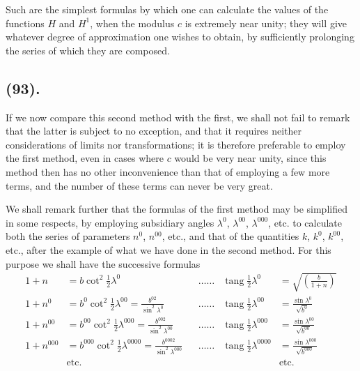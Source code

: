 \documentclass{article}
\begin{document}
Such are the simplest formulas by which one can calculate the values of the functions $H$ and $H^{1}$, when the modulus $c$ is extremely near unity; they will give whatever degree of approximation one wishes to obtain, by sufficiently prolonging the series of which they are composed.

\subsection*{(93).}

If we now compare this second method with the first, we shall not fail to remark that the latter is subject to no exception, and that it requires neither considerations of limits nor transformations; it is therefore preferable to employ the first method, even in cases where $c$ would be very near unity, since this method then has no other inconvenience than that of employing a few more terms, and the number of these terms can never be very great.

We shall remark further that the formulas of the first method may be simplified in some respects, by employing subsidiary angles $\lambda^{0}$, $\lambda^{00}$, $\lambda^{000}$, etc. to calculate both the series of parameters $n^{0}$, $n^{00}$, etc., and that of the quantities $k$, $k^{0}$, $k^{00}$, etc., after the example of what we have done in the second method. For this purpose we shall have the successive formulas
\[ \begin{aligned} 1+n&=b\cot^{2}\tfrac{1}{2}\lambda^{0} &&\ldots\ldots &\operatorname{tang}\tfrac{1}{2}\lambda^{0}&=\sqrt{\left(\frac{b}{1+n}\right)}\\ 1+n^{0}&=b^{0}\cot^{2}\tfrac{1}{2}\lambda^{00}=\frac{b^{02}}{\sin^{2}\lambda^{0}} &&\ldots\ldots &\operatorname{tang}\tfrac{1}{2}\lambda^{00}&=\frac{\sin\lambda^{0}}{\sqrt{b^{0}}}\\ 1+n^{00}&=b^{00}\cot^{2}\tfrac{1}{2}\lambda^{000}=\frac{b^{002}}{\sin^{2}\lambda^{00}} &&\ldots\ldots &\operatorname{tang}\tfrac{1}{2}\lambda^{000}&=\frac{\sin\lambda^{00}}{\sqrt{b^{00}}}\\ 1+n^{000}&=b^{000}\cot^{2}\tfrac{1}{2}\lambda^{0000}=\frac{b^{0002}}{\sin^{2}\lambda^{000}} &&\ldots\ldots &\operatorname{tang}\tfrac{1}{2}\lambda^{0000}&=\frac{\sin\lambda^{000}}{\sqrt{b^{000}}}\\ &\text{etc.} &&& &\text{etc.} \end{aligned} \]
\end{document}
